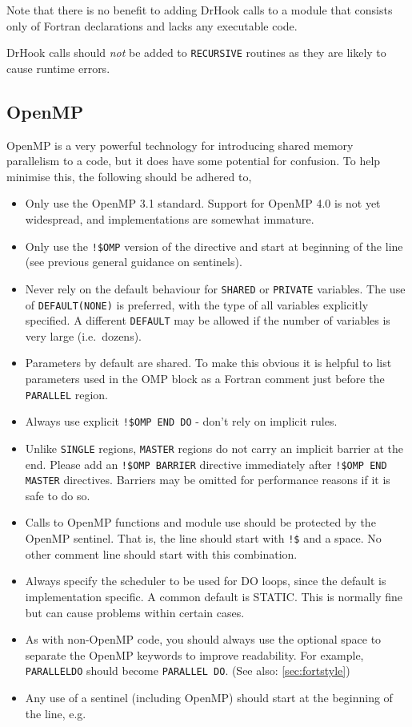 Note that there is no benefit to adding DrHook calls to a module that consists
only of Fortran declarations and lacks any executable code.

DrHook calls should \emph{not} be added to \verb|RECURSIVE| routines as they
are likely to cause runtime errors.


\subsection{OpenMP}\label{OpenMP}

OpenMP is a very powerful technology for introducing shared memory
parallelism to a code, but it does have some potential for confusion.
To help minimise this, the following should be adhered to,

\begin{itemize}
  \item Only use the OpenMP 3.1 standard. Support for OpenMP 4.0 is not yet widespread, and implementations are somewhat immature.
  \item Only use the \verb|!$OMP| version of the directive and start at beginning of the line (see previous general guidance on sentinels).
  \item Never rely on the default behaviour for \verb|SHARED| or \verb|PRIVATE|
        variables. The use of \verb|DEFAULT(NONE)| is preferred, with the type
        of all variables explicitly specified. A different \verb|DEFAULT| may be
        allowed if the number of variables is very large (i.e.\ dozens).
  \item Parameters by default are shared.  To make this obvious it is helpful to list parameters used in the OMP block as a Fortran comment just before the \verb|PARALLEL| region.
  \item Always use explicit \verb|!$OMP END DO| - don't rely on implicit rules.
  \item Unlike \verb|SINGLE| regions, \verb|MASTER| regions do not carry an implicit barrier at the end.
        Please add an \verb|!$OMP BARRIER| directive immediately after \verb|!$OMP END MASTER| directives.
        Barriers may be omitted for performance reasons if it is safe to do so.
  \item Calls to OpenMP functions and module use should be protected by the
  OpenMP sentinel. That is, the line should start with \verb|!$| and a space. No
  other comment line should start with this combination.
  \item Always specify the scheduler to be used for DO loops, since the default is implementation specific. A common default is STATIC. This is normally fine but can cause problems within certain cases.
  \item As with non-OpenMP code, you should always use the optional space
        to separate the OpenMP keywords to improve readability. For example,
        \verb|PARALLELDO| should become \verb|PARALLEL DO|. (See also: \ref{sec:fortstyle})
\item Any use of a sentinel (including OpenMP) should start at the beginning of the line, e.g.


\end{itemize}
